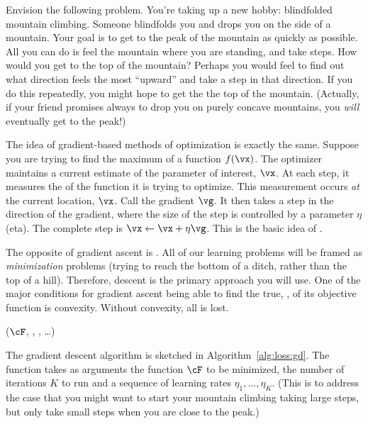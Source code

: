 Envision the following problem.  You're taking up a new hobby:
blindfolded mountain climbing.  Someone blindfolds you and drops you
on the side of a mountain.  Your goal is to get to the peak of the
mountain as quickly as possible.  All you can do is feel the mountain
where you are standing, and take steps.  How would you get to the top
of the mountain?  Perhaps you would feel to find out what direction
feels the most ``upward'' and take a step in that direction.  If you
do this repeatedly, you might hope to get the the top of the mountain.
(Actually, if your friend promises always to drop you on purely
concave mountains, you \emph{will} eventually get to the peak!)

The idea of gradient-based methods of optimization is exactly the
same.  Suppose you are trying to find the maximum of a function
$f(\vx)$.  The optimizer maintains a current estimate of the parameter
of interest, $\vx$.  At each step, it measures the 
of the function it is trying to optimize.  This measurement occurs
\emph{at} the current location, $\vx$.  Call the gradient $\vg$.  It
then takes a step in the direction of the gradient, where the size of
the step is controlled by a parameter $\eta$ (eta).  The complete step
is $\vx \leftarrow \vx + \eta \vg$.  This is the basic idea of
.

The opposite of gradient ascent is .  All of
our learning problems will be framed as \emph{minimization} problems
(trying to reach the bottom of a ditch, rather than the top of a
hill).  Therefore, descent is the primary approach you will use.
One of the major conditions for gradient ascent being able to find the
true, , of its objective function is
convexity.  Without convexity, all is lost.


%
  {($\cF$, , , \dots)}
  {
\SETST{$\vz\kth$}{$\VARm{\vz\kpth} - \VARm{\eta}\VARm{\kth} \VARm{\vg\kth}$}
\ENDFOR
\RETURN \VARm{$\vz\Kth$}
}


The gradient descent algorithm is sketched in
Algorithm~\ref{alg:loss:gd}.  The function takes as arguments the
function $\cF$ to be minimized, the number of iterations $K$ to run
and a sequence of learning rates $\eta_1, \dots, \eta_K$.  (This is to
address the case that you might want to start your mountain climbing
taking large steps, but only take small steps when you are close to
the peak.)

